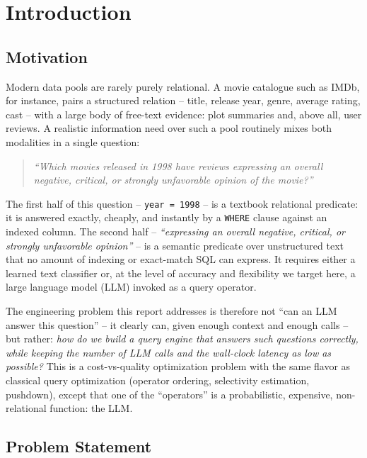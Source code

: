 \chapter{Introduction}
\label{chap:intro}

\section{Motivation}

Modern data pools are rarely purely relational. A movie catalogue such as
IMDb, for instance, pairs a structured relation -- title, release year,
genre, average rating, cast -- with a large body of free-text evidence:
plot summaries and, above all, user reviews. A realistic information need
over such a pool routinely mixes both modalities in a single question:

\begin{quote}
\emph{``Which movies released in 1998 have reviews expressing an overall
negative, critical, or strongly unfavorable opinion of the movie?''}
\end{quote}

The first half of this question -- \texttt{year = 1998} -- is a textbook
relational predicate: it is answered exactly, cheaply, and instantly by a
\texttt{WHERE} clause against an indexed column. The second half --
\emph{``expressing an overall negative, critical, or strongly unfavorable
opinion''} -- is a semantic predicate over unstructured text that no
amount of indexing or exact-match SQL can express. It requires either a
learned text classifier or, at the level of accuracy and flexibility we
target here, a large language model (LLM) invoked as a query operator.

The engineering problem this report addresses is therefore not ``can an
LLM answer this question'' -- it clearly can, given enough context and
enough calls -- but rather: \emph{how do we build a query engine that
answers such questions correctly, while keeping the number of LLM calls
and the wall-clock latency as low as possible?} This is a cost-vs-quality
optimization problem with the same flavor as classical query optimization
(operator ordering, selectivity estimation, pushdown), except that one of
the ``operators'' is a probabilistic, expensive, non-relational function:
the LLM.

\section{Problem Statement}
\label{sec:intro-problem}

